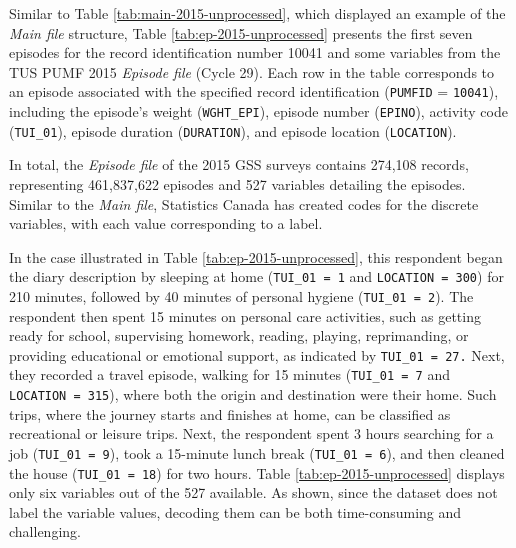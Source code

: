 \documentclass[Royal,times,sageh]{sagej}
\begin{document}
Similar to Table \ref{tab:main-2015-unprocessed}, which displayed an
example of the \emph{Main file} structure, Table
\ref{tab:ep-2015-unprocessed} presents the first seven episodes for the
record identification number 10041 and some variables from the TUS PUMF
2015 \emph{Episode file} (Cycle 29). Each row in the table corresponds
to an episode associated with the specified record identification
(\texttt{PUMFID} = \texttt{10041}), including the episode's weight
(\texttt{WGHT\_EPI}), episode number (\texttt{EPINO}), activity code
(\texttt{TUI\_01}), episode duration (\texttt{DURATION}), and episode
location (\texttt{LOCATION}).

In total, the \emph{Episode file} of the 2015 GSS surveys contains
274,108 records, representing 461,837,622 episodes and 527 variables
detailing the episodes. Similar to the \emph{Main file}, Statistics
Canada has created codes for the discrete variables, with each value
corresponding to a label.

In the case illustrated in Table \ref{tab:ep-2015-unprocessed}, this
respondent began the diary description by sleeping at home
(\texttt{TUI\_01\ =\ 1} and \texttt{LOCATION\ =\ 300}) for 210 minutes,
followed by 40 minutes of personal hygiene (\texttt{TUI\_01\ =\ 2}). The
respondent then spent 15 minutes on personal care activities, such as
getting ready for school, supervising homework, reading, playing,
reprimanding, or providing educational or emotional support, as
indicated by \texttt{TUI\_01\ =\ 27.} Next, they recorded a travel
episode, walking for 15 minutes (\texttt{TUI\_01\ =\ 7} and
\texttt{LOCATION\ =\ 315}), where both the origin and destination were
their home. Such trips, where the journey starts and finishes at home,
can be classified as recreational or leisure trips. Next, the respondent
spent 3 hours searching for a job (\texttt{TUI\_01\ =\ 9}), took a
15-minute lunch break (\texttt{TUI\_01\ =\ 6}), and then cleaned the
house (\texttt{TUI\_01\ =\ 18}) for two hours. Table
\ref{tab:ep-2015-unprocessed} displays only six variables out of the 527
available. As shown, since the dataset does not label the variable
values, decoding them can be both time-consuming and challenging.

\begingroup\fontsize{8}{10}\selectfont
\end{document}
